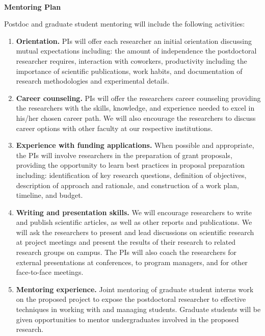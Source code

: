 \begin{center} 
    {\large \bf \TITLE } \\ 
    {\bf Mentoring Plan}
\end{center} 

Postdoc and graduate student mentoring will include the
following activities:

\begin{enumerate}
    \itemsep=-1pt
    \item {\bf Orientation.} PIs will offer each researcher 
        an
        initial orientation discussing mutual expectations including: the
        amount of independence the postdoctoral researcher requires,
        interaction with coworkers, productivity including the importance of
        scientific publications, work habits, and documentation of research
        methodologies and experimental details.

    \item {\bf Career counseling.} PIs will offer the researchers
        career counseling providing the researchers with the
        skills, knowledge, and experience needed to excel in his/her chosen
        career path.  We will also encourage the researchers to
        discuss career options with other faculty at our respective
        institutions. 

\item {\bf Experience with funding applications.} When possible and
    appropriate, the PIs will involve researchers in the
        preparation of grant proposals, providing the opportunity to learn
        best practices in proposal preparation including: identification of
        key research questions, definition of objectives, description of
        approach and rationale, and construction of a work plan, timeline, and
        budget.

    \item {\bf Writing and presentation skills. }
       We will encourage researchers to
        write and publish scientific articles,
        as well as other reports and publications.  We will ask the
        researchers to present and lead discussions on scientific
        research at project meetings and present the results of their research
        to related research groups on campus. The PIs will also coach the
        researchers for external presentations at conferences, to
        program managers, and for other face-to-face meetings. 

\item {\bf Mentoring experience.} 
    Joint mentoring of graduate student interns work on the proposed project
    to expose the postdoctoral researcher to effective techniques in working
        with and managing students. Graduate students will be given
        opportunities to mentor undergraduates involved in the proposed
        research.


\end{enumerate}
